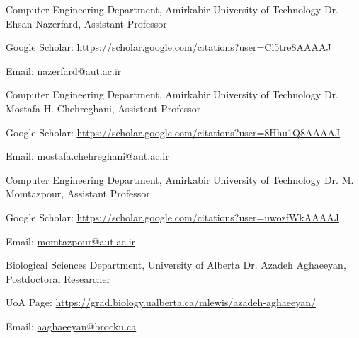 \begin{cventries}
  \cventry
    {Computer Engineering Department, Amirkabir University of Technology} %
    {Dr. Ehsan Nazerfard, Assistant Professor} %
    {} %
    {} %
    {
      \begin{cvitems} %
        \item {Google Scholar: \href{https://scholar.google.com/citations?user=Cl5tre8AAAAJ&hl=en}{https://scholar.google.com/citations?user=Cl5tre8AAAAJ}}
        \item {Email: \href{mailto:nazerfard@aut.ac.ir}{nazerfard@aut.ac.ir}}
      \end{cvitems}
    }

  \cventry
    {Computer Engineering Department, Amirkabir University of Technology} %
    {Dr. Mostafa H. Chehreghani, Assistant Professor} %
    {} %
    {} %
    {
      \begin{cvitems} %
        \item {Google Scholar: \href{https://scholar.google.com/citations?user=8Hhu1Q8AAAAJ&hl=en}{https://scholar.google.com/citations?user=8Hhu1Q8AAAAJ}}
        \item {Email: \href{mailto:mostafa.chehreghani@aut.ac.ir}{mostafa.chehreghani@aut.ac.ir}}
      \end{cvitems}
    }

  \cventry
    {Computer Engineering Department, Amirkabir University of Technology} %
    {Dr. M. Momtazpour, Assistant Professor} %
    {} %
    {} %
    {
      \begin{cvitems} %
        \item {Google Scholar: \href{https://scholar.google.com/citations?user=uwozfWkAAAAJ&hl=en}{https://scholar.google.com/citations?user=uwozfWkAAAAJ}}
        \item {Email: \href{mailto:momtazpour@aut.ac.ir}{momtazpour@aut.ac.ir}}
      \end{cvitems}
    }

  \cventry
    {Biological Sciences Department, University of Alberta} %
    {Dr. Azadeh Aghaeeyan, Postdoctoral Researcher} %
    {} %
    {} %
    {
      \begin{cvitems} %
        \item {UoA Page: \href{https://grad.biology.ualberta.ca/mlewis/azadeh-aghaeeyan/}{https://grad.biology.ualberta.ca/mlewis/azadeh-aghaeeyan/}}
        \item {Email: \href{mailto:aaghaeeyan@brocku.ca}{aaghaeeyan@brocku.ca}}
      \end{cvitems}
    }

\end{cventries}
